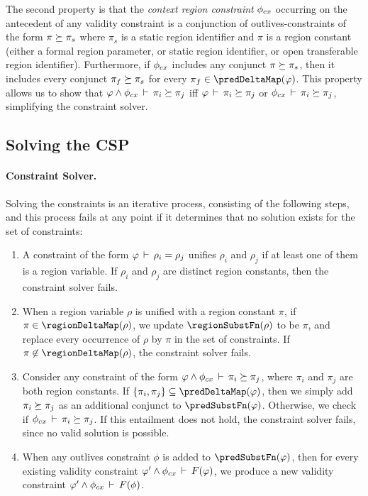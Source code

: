 The second property is that the \emph{context region constraint} $\phi_{cx}$
occurring on the antecedent of any validity constraint is a conjunction of
outlives-constraints of the form $\pi \succeq \pi_s$ where $\pi_s$
is a static region identifier and $\pi$ is a region constant (either a formal
region parameter, or static region identifier, or open transferable region identifier).
Furthermore, if $\phi_{cx}$ includes any conjunct $\pi \succeq \pi_s$, then
it includes every conjunct $\pi_f \succeq \pi_s$ for every $\pi_f \in \predDeltaMap(\varphi)$.
This property allows us to show that $\varphi \wedge \phi_{cx}\,\vdash\,\pi_i \succeq \pi_j$
iff $\varphi\,\vdash\,\pi_i \succeq \pi_j$ or $\phi_{cx}\,\vdash\,\pi_i \succeq \pi_j$,
simplifying the constraint solver.

\subsection{Solving the CSP}

\paragraph{Constraint Solver.}
Solving the constraints is an iterative process, consisting of the following
steps, and this process fails at any point if it determines that no solution
exists for the set of constraints:

\begin{enumerate}

\item
    A constraint of the form $\varphi\,\vdash\,\rho_i = \rho_j$ unifies
$\rho_i$ and $\rho_j$ if at least one of them is a region variable.
If $\rho_i$ and $\rho_j$ are distinct region constants, then the constraint
solver fails.

\item
When a region variable $\rho$ is unified with a region constant $\pi$,
if $\pi \in \regionDeltaMap(\rho)$, we update $\regionSubstFn(\rho)$ to be $\pi$,
and replace every occurrence of $\rho$ by $\pi$ in the set of constraints.
If $\pi \not\in \regionDeltaMap(\rho)$, the constraint solver fails.

\item
\label{item:context}
Consider any constraint of the form $\varphi \wedge \phi_{cx}\,\vdash\,\pi_i \succeq \pi_j$,
where $\pi_i$ and $\pi_j$ are both region constants.
If $\{ \pi_i, \pi_j \} \subseteq \predDeltaMap(\varphi)$, then we simply add
$\pi_i \succeq \pi_j$ as an additional conjunct to $\predSubstFn(\varphi)$.
Otherwise, we check if $\phi_{cx}\,\vdash\,\pi_i \succeq \pi_j$.
If this entailment does not hold, the constraint solver fails, since no valid solution is possible.

\item
  When any outlives constraint $\phi$ is added to $\predSubstFn(\varphi)$,
  then for every existing validity constraint $\varphi' \wedge \phi_{cx}\,\vdash\,F(\varphi)$,
  we produce a new validity constraint $\varphi' \wedge \phi_{cx}\,\vdash\,F(\phi)$. 
\end{enumerate}

